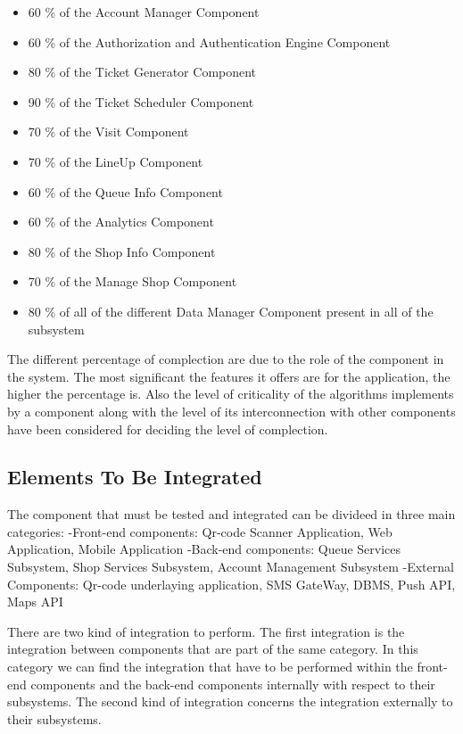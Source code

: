 \begin{itemize}
        \begin{itemize}
            \item 60 \% of the Account Manager Component
            \item 60 \% of the Authorization and Authentication Engine Component
            \item 80 \% of the Ticket Generator 
            Component
            \item 90 \% of the Ticket Scheduler Component
            \item 70 \% of the Visit Component
            \item 70 \% of the LineUp Component
            \item  60 \% of the Queue Info Component
            \item  60 \% of the Analytics Component
            \item 80 \% of the Shop Info Component
            \item 70 \% of the Manage Shop Component
            \item 80 \% of all of the different Data Manager Component present in all of the subsystem
        \end{itemize}
        The different percentage of complection are due to the role of the component in the system. The most significant the features it offers are for the application, the higher the percentage is. Also the level of criticality of the algorithms implements by a component along with the level of its interconnection with other components have been considered for deciding the level of complection.
\end{itemize}


\subsection{Elements To Be Integrated}
\label{subsect: entrycriteria}
The component that must be tested and integrated can be divideed in three main categories:
-Front-end components: Qr-code Scanner Application, Web Application, Mobile Application 
-Back-end components: Queue Services Subsystem, Shop Services Subsystem, Account Management Subsystem
-External Components: Qr-code underlaying application, SMS GateWay, DBMS, Push API, Maps API

There are two kind of integration to perform. The first integration is the integration between components that are part of the same category.
In this category we can find the integration that have to be performed within the front-end components and the back-end components internally with respect to their subsystems.
The second kind of integration concerns the integration externally to their subsystems.

